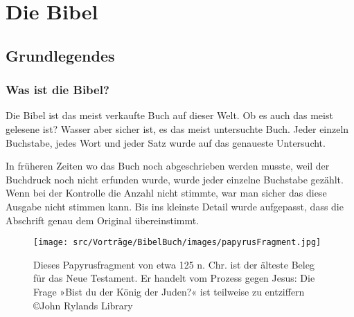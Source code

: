 \section{Die Bibel}
\subsection{Grundlegendes}
\subsubsection{Was ist die Bibel?}
Die Bibel ist das meist verkaufte Buch auf dieser Welt. Ob es auch das meist gelesene ist? Wasser aber sicher ist, es das meist untersuchte Buch. Jeder einzeln Buchstabe, jedes Wort und jeder Satz wurde auf das genaueste Untersucht.

In früheren Zeiten wo das Buch noch abgeschrieben werden musste, weil der Buchdruck noch nicht erfunden wurde, wurde jeder einzelne Buchstabe gezählt. Wenn bei der Kontrolle die Anzahl nicht stimmte, war man sicher das diese Ausgabe nicht stimmen kann. Bis ins kleinste Detail wurde aufgepasst, dass die Abschrift genau dem Original übereinstimmt.
\begin{figure}
    \centering
    \texttt{[image: src/Vorträge/BibelBuch/images/papyrusFragment.jpg]}
    \caption{Dieses Papyrusfragment von etwa 125 n. Chr. ist der älteste Beleg für das Neue Testament. Er handelt vom Prozess gegen Jesus: Die Frage »Bist du der König der Juden?« ist teilweise zu entziffern\\
©John Rylands Library}
    \label{fig:enter-label}
\end{figure}